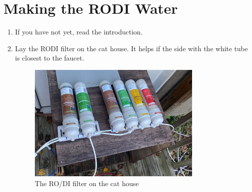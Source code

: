 \documentclass{report}
\begin{document}
\section{Making the RODI Water}
\begin{enumerate}
    \item If you have not yet, read the introduction. 
    \item Lay the RODI filter on the cat house. It helps if the side with the white tube is closest to the faucet.
    \begin{figure}[H]
        \centering
        \includegraphics[width=0.8\textwidth]{RodiSetup.jpg}
        \caption{The RO/DI filter on the cat house}
    \end{figure}
    

\end{enumerate}
\end{document}
